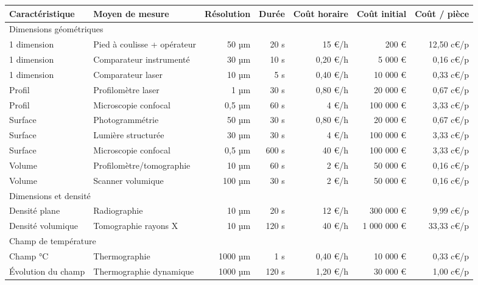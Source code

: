 \begin{table}[htpb]
	\hspace*{-1,5cm}
	\begin{tabular}{|l|l|r|r|r|r|r|}
		\arrayrulecolor{black}
		\hline
		Caractéristique & Moyen de mesure & Résolution & Durée & Coût horaire & Coût initial & Coût / pièce \\ \hline
		\hline
		\multicolumn{7}{|l|}{Dimensions géométriques} \\ \hline
		1 dimension & Pied à coulisse + opérateur & 50 µm & 20 s & 15 €/h & 200 € & 12,50 c€/p \\ \hline
		1 dimension & Comparateur instrumenté & 30 µm & 10 s & 0,20 €/h & 5 000 € & 0,16 c€/p \\ \hline
		1 dimension & Comparateur laser & 10 µm & 5 s & 0,40 €/h & 10 000 € & 0,33 c€/p \\ \hline
		\hline
		Profil & Profilomètre laser & 1 µm & 30 s & 0,80 €/h & 20 000 € & 0,67 c€/p \\ \hline
		Profil & Microscopie confocal & 0,5 µm & 60 s & 4 €/h & 100 000 € & 3,33 c€/p \\ \hline
		\hline
		Surface & Photogrammétrie & 50 µm & 30 s & 0,80 €/h & 20 000 € & 0,67 c€/p \\ \hline
		Surface & Lumière structurée & 30 µm & 30 s & 4 €/h & 100 000 € & 3,33 c€/p \\ \hline  %
		Surface & Microscopie confocal & 0,5 µm & 600 s & 40 €/h & 100 000 € & 3,33 c€/p \\ \hline
		\hline
		Volume & Profilomètre/tomographie & 10 µm & 60 s & 2 €/h & 50 000 € & 0,16 c€/p \\ \hline
		Volume & Scanner volumique & 100 µm & 30 s & 2 €/h & 50 000 € & 0,16 c€/p \\ \hline
		\hline
		\multicolumn{7}{|l|}{Dimensions et densité} \\ \hline
		Densité plane & Radiographie & 10 µm & 20 s & 12 €/h & 300 000 € & 9,99 c€/p \\ \hline
		Densité volumique & Tomographie rayons X & 10 µm & 120 s & 40 €/h & 1 000 000 € & 33,33 c€/p \\ \hline
		\hline
		\multicolumn{7}{|l|}{Champ de température} \\ \hline
		Champ °C & Thermographie & 1000 µm & 1 s & 0,40 €/h & 10 000 € & 0,33 c€/p \\ \hline
		Évolution du champ & Thermographie dynamique & 1000 µm & 120 s & 1,20 €/h & 30 000 € & 1,00 c€/p \\ \hline

\end{tabular}
\end{table}
